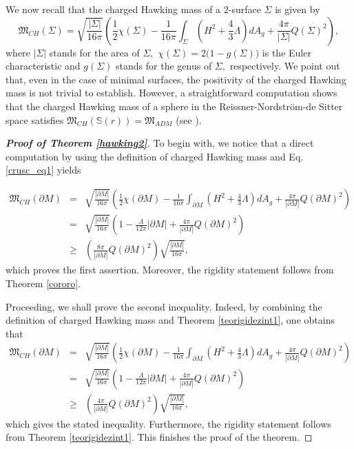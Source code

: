 \documentclass{amsart}
\numberwithin{equation}{section}
\begin{document}
	We now recall that the charged Hawking mass of a $2$-surface $\Sigma$ is given by
	\begin{equation*}
		\mathfrak{M}_{CH}(\Sigma) = \sqrt{\frac{|\Sigma|}{16 \pi}}\left(\frac{1}{2}\chi(\Sigma) - \frac{1}{16\pi}\int_{\Sigma}(H^2 + \frac{4}{3}\Lambda)dA_{g} + \frac{4\pi}{|\Sigma|}Q(\Sigma)^2 \right),
	\end{equation*} where $|\Sigma|$ stands for the area of $\Sigma,$ $\chi(\Sigma)=2\big(1-g(\Sigma)\big)$ is the Euler characteristic and $g(\Sigma)$ stands for the genus of $\Sigma,$ respectively. We point out that, even in the case of minimal surfaces, the positivity of the charged Hawking mass is not trivial to establish. However, a straightforward computation shows that the charged Hawking mass of a sphere in the Reissner-Nordstr\"om-de Sitter space satisfies $\mathfrak{M}_{CH}(\mathbb{S}(r))=\mathfrak{M}_{ADM}$ (see \cite[p. 6]{baltazar2023}).
	
	


\begin{proof}[{\bf Proof of Theorem \ref{hawking2}}]
To begin with, we notice that a direct computation by using the definition of charged Hawking mass and Eq. \eqref{crusc_eq1} yields

\begin{eqnarray*}
			\mathfrak{M}_{CH}(\partial M)&=&\sqrt{\frac{|\partial M|}{16 \pi}}\left(\frac{1}{2}\chi(\partial M) - \frac{1}{16\pi}\int_{\partial M}(H^2 + \frac{4}{3}\Lambda)dA_g + \frac{4\pi}{|\partial M|}Q(\partial M)^2 \right)\\
			&=&\sqrt{\frac{|\partial M|}{16 \pi}}\left(1 - \frac{\Lambda}{12\pi}\vert\partial M\vert + \frac{4\pi}{|\partial M|}Q(\partial M)^2 \right)\\
			&\geq&\left( \frac{8\pi}{|\partial M|}Q(\partial M)^2 \right)\sqrt{\frac{|\partial M|}{16 \pi}},
		\end{eqnarray*}  which proves the first assertion. Moreover, the rigidity statement follows from Theorem \ref{cororo}.
		
		
		
Proceeding, we shall prove the second inequality. Indeed, by combining the definition of charged Hawking mass and Theorem \ref{teorigidezint1}, one obtains that
		\begin{eqnarray*}
			\mathfrak{M}_{CH}(\partial M)&=&\sqrt{\frac{|\partial M|}{16 \pi}}\left(\frac{1}{2}\chi(\partial M) - \frac{1}{16\pi}\int_{\partial M}(H^2 + \frac{4}{3}\Lambda)dA_g + \frac{4\pi}{|\partial M|}Q(\partial M)^2 \right)\\
			&=&\sqrt{\frac{|\partial M|}{16 \pi}}\left(1 - \frac{\Lambda}{12\pi}\vert\partial M\vert + \frac{4\pi}{|\partial M|}Q(\partial M)^2 \right)\\
			&\geq&\left( \frac{4\pi}{|\partial M|}Q(\partial M)^2 \right)\sqrt{\frac{|\partial M|}{16 \pi}},
		\end{eqnarray*} which gives the stated inequality. Furthermore, the rigidity statement follows from Theorem  \ref{teorigidezint1}. This finishes the proof of the theorem. 
		
	\end{proof}
	
\end{document}
